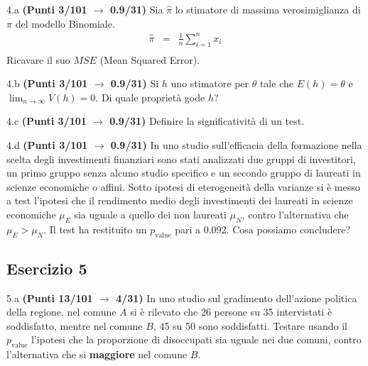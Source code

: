 \documentclass[
  11pt,
]{book}
\theoremstyle{mytheoremstyle}
\theoremstyle{mydefstyle}
\begin{document}
4.a \textbf{(Punti 3/101 \(\rightarrow\) 0.9/31)} Sia \(\hat \pi\) lo stimatore di massima verosimiglianza di \(\pi\) del modello Binomiale.
\begin{eqnarray*}
  \hat\pi &=&  \frac 1n\sum_{i=1}^nx_i\\
\end{eqnarray*}
Ricavare il suo \(MSE\) (Mean Squared Error).

4.b \textbf{(Punti 3/101 \(\rightarrow\) 0.9/31)} Si \(h\) uno stimatore per \(\theta\) tale che \(E(h)=\theta\) e \(\lim_{n\to\infty} V(h)=0\). Di quale proprietà gode \(h\)?

4.c \textbf{(Punti 3/101 \(\rightarrow\) 0.9/31)} Definire la significatività di un test.

4.d \textbf{(Punti 3/101 \(\rightarrow\) 0.9/31)} In uno studio sull'efficacia della formazione nella scelta degli investimenti finanziari sono stati analizzati due gruppi di investitori, un primo gruppo senza alcuno studio specifico e un secondo gruppo di laureati in scienze economiche o affini. Sotto ipotesi di eterogeneità della varianze si è messo a test l'ipotesi che il rendimento medio degli investimenti dei laureati in scienze economiche \(\mu_E\) sia uguale a quello dei non laureati \(\mu_N\), contro l'alternativa che \(\mu_E>\mu_N\). Il test ha restituito un \(p_\text{value}\) pari a 0.092. Cosa possiamo concludere?

\subsection{Esercizio 5}\label{esercizio-5-18}

5.a \textbf{(Punti 13/101 \(\rightarrow\) 4/31)} In uno studio sul gradimento dell'azione politica della regione, nel comune \(A\) si è rilevato che 26 persone su 35 intervistati è soddisfatto, mentre nel comune \(B\), 45 su 50 sono soddisfatti.
Testare usando il \(p_\text{value}\) l'ipotesi che la proporzione di disoccupati sia uguale nei due comuni, contro l'alternativa che si \textbf{maggiore} nel comune \(B\).
\end{document}
